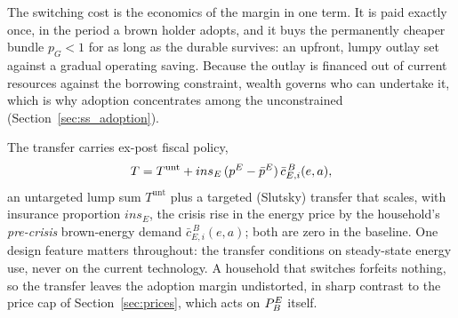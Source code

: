 The switching cost is the economics of the margin in one term. It is paid exactly
once, in the period a brown holder adopts, and it buys the permanently cheaper
bundle $p_G<1$ for as long as the durable survives: an upfront, lumpy outlay set
against a gradual operating saving. Because the outlay is financed out of current
resources against the borrowing constraint, wealth governs who can undertake it,
which is why adoption concentrates among the unconstrained
(Section~\ref{sec:ss_adoption}).

The transfer carries ex-post fiscal policy,
%
\begin{equation}
T=T^{\mathrm{unt}}+ins_E\,(p^{E}-\bar p^E)\,\bar c^{\,B}_{E,i}(e, a),
\label{eq:transfer-hh}
\end{equation}
%
an untargeted lump sum $T^{\mathrm{unt}}$ plus a targeted (Slutsky) transfer that
scales, with insurance proportion $ins_E$, the crisis rise in the energy price by the
household's
\emph{pre-crisis} brown-energy demand $\bar c^{\,B}_{E,i}(e, a)$; both are zero in the
baseline. One design feature matters throughout: the transfer conditions on
steady-state energy use, never on the current technology. A household that switches
forfeits nothing, so the transfer leaves the adoption margin undistorted, in sharp
contrast to the price cap of Section~\ref{sec:prices}, which acts on $P^{E}_{B}$ itself.

